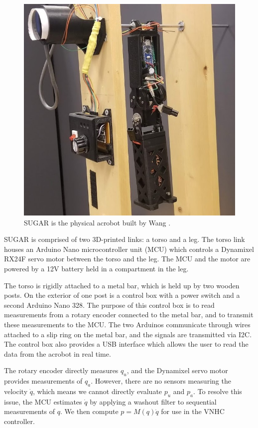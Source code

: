 \documentclass[journal,twoside,web]{ieeecolor}
\begin{document}
{\begin{figure}
    \centering
    \includegraphics[width=0.9\linewidth]{xingbo_acrobot.jpg}
    \caption{SUGAR is the physical acrobot built by Wang \cite{xingbo_thesis}.}
    \label{fig:xingbo-acrobot}
\end{figure}

SUGAR is comprised of two 3D-printed links: a torso and a leg.
The torso link houses an Arduino Nano microcontroller unit (MCU) which controls
a Dynamixel RX24F servo motor between the torso and the leg.
The MCU and the motor are powered by a 12V battery held in a compartment
in the leg.

The torso is rigidly attached to a metal bar, which is held up by two wooden
posts.
On the exterior of one post is a control box with a power switch and a second
Arduino Nano 328.
The purpose of this control box is to read measurements from a rotary
encoder connected to the metal bar, and to transmit these measurements to the
MCU.
The two Arduinos communicate through wires attached to a slip ring on the metal
bar, and the signals are transmitted via I2C.
The control box also provides a USB interface which allows the user to read the
data from the acrobot in real time.

The rotary encoder directly measures \(q_u\), and the Dynamixel servo
motor provides measurements of \(q_a\).
However, there are no sensors measuring the velocity \(\dot{q}\), which means we cannot
directly evaluate \(p_u\) and \(p_a\).
To resolve this issue, the MCU estimates \(\dot{q}\) by applying a washout
filter to sequential measurements of \(q\).
We then compute \(p = M(q)\dot{q}\) for use in the VNHC controller.

}
\end{document}
